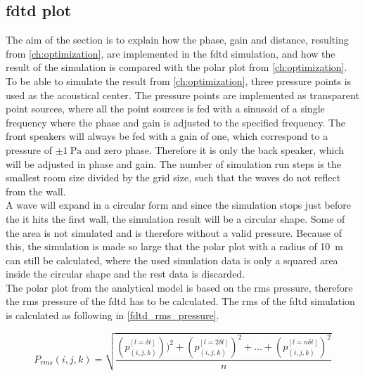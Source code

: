 \subsection{\gls{fdtd} plot}
The aim of the section is to explain how the phase, gain and distance, resulting from \autoref{ch:optimization}, are implemented in the \gls{fdtd} simulation, and how the result of the simulation is compared with the polar plot from \autoref{ch:optimization}. \\

To be able to simulate the result from \autoref{ch:optimization}, three pressure points is used as the acoustical center. The pressure points are implemented as transparent point sources, where all the point sources is fed with a sinusoid of a single frequency where the phase and gain is adjusted to the specified frequency. The front speakers will always be fed with a gain of one, which correspond to a pressure of $\pm \SI{1}{\pascal}$ and zero phase. Therefore it is only the back speaker, which will be adjusted in phase and gain. The number of simulation run steps is the smallest room size divided by the grid size, such that the waves do not reflect from the wall. \\

A wave will expand in a circular form and since the simulation stops just before the it hits the first wall, the simulation result will be a circular shape. Some of the area is not simulated and is therefore without a valid pressure. Because of this, the simulation is made so large that the polar plot with a radius of \SI{10}{\meter} can still be calculated, where the used simulation data is only a squared area inside the circular shape and the rest data is discarded.\\

The polar plot from the analytical model is based on the \gls{rms} pressure, therefore the \gls{rms} pressure of the \gls{fdtd} has to be calculated. The \gls{rms} of the \gls{fdtd} simulation is calculated as following in \autoref{fdtd_rms_pressure}.

\begin{equation}\label{fdtd_rms_pressure}
P_{rms}(i,j,k)=\sqrt{\frac{\left(p_{(i,j,k)}^{[l= \delta t]} \right))^2 + \left(p_{(i,j,k)}^{[l= 2\delta t]}\right)^2 +...+\left(p_{(i,j,k)}^{[l= n\delta t]}\right)^2}{n}}
\end{equation}



